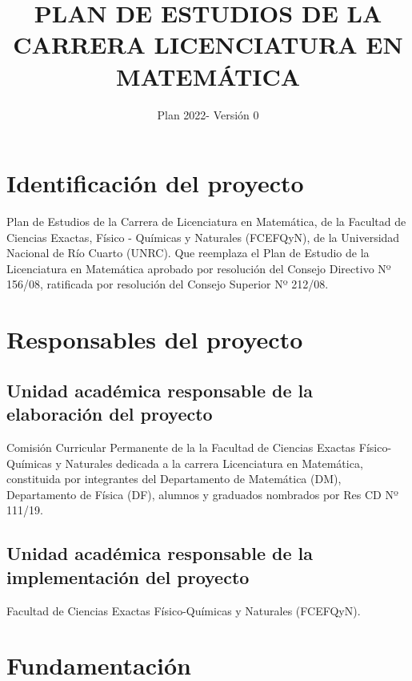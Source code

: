 \documentclass[a4paper, 12pt]{article}
\begin{document}
\title{PLAN DE ESTUDIOS DE LA CARRERA LICENCIATURA EN MATEMÁTICA}
\author{Plan 2022- Versión 0}
\date{}
 \maketitle

 \newpage



\tableofcontents

\newpage


\section{Identificación del proyecto}  

Plan de Estudios de la 
Carrera de Licenciatura en Matemática, de la Facultad de Ciencias Exactas, 
Físico - Químicas y Naturales (FCEFQyN), de la Universidad Nacional de Río Cuarto (UNRC). Que reemplaza el Plan de Estudio de la Licenciatura en Matemática aprobado por resolución del Consejo Directivo Nº 156/08, 
ratificada por resolución del Consejo Superior Nº 212/08.


\section{Responsables del proyecto}

\subsection{Unidad académica responsable de la elaboración del proyecto}

Comisión Curricular Permanente de la 
la Facultad de Ciencias Exactas Físico-Químicas y Naturales dedicada a la carrera Licenciatura en Matemática, constituida por integrantes del Departamento de Matemática (DM), Departamento de Física (DF), alumnos y graduados nombrados por Res CD Nº  111/19.  

\subsection{Unidad académica responsable de la implementación del proyecto}

Facultad de Ciencias Exactas Físico-Químicas y Naturales (FCEFQyN). 



\section{Fundamentación}
\end{document}
